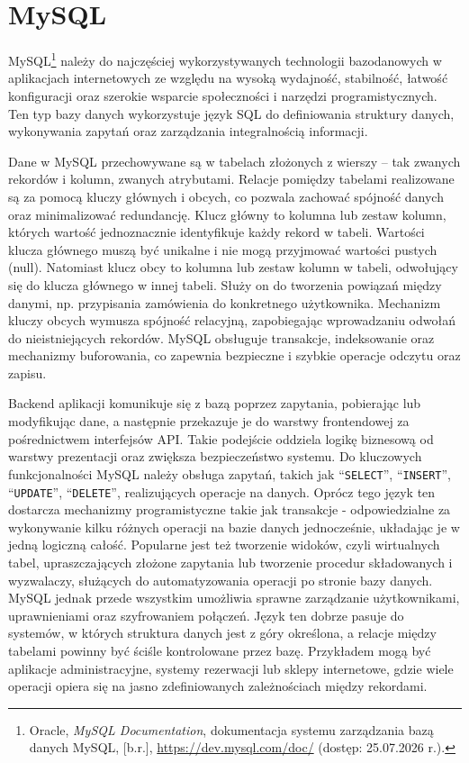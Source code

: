 \documentclass[12pt,a4paper,twoside]{report}
\newcommand{\FirstParagraph}{\noindent\ignorespaces}
\begin{document}
\section{MySQL}

\FirstParagraph MySQL\footnote{Oracle, \emph{MySQL Documentation}, dokumentacja systemu zarządzania bazą danych MySQL, [b.r.], \url{https://dev.mysql.com/doc/} (dostęp: 25.07.2026 r.).} należy do najczęściej wykorzystywanych technologii bazodanowych w aplikacjach internetowych ze względu na wysoką wydajność, stabilność, łatwość konfiguracji oraz szerokie wsparcie społeczności i narzędzi programistycznych. Ten typ bazy danych wykorzystuje język SQL do definiowania struktury danych, wykonywania zapytań oraz zarządzania integralnością informacji.

Dane w MySQL przechowywane są w tabelach złożonych z wierszy -- tak zwanych rekordów i kolumn, zwanych atrybutami. Relacje pomiędzy tabelami realizowane są za pomocą kluczy głównych i obcych, co pozwala zachować spójność danych oraz minimalizować redundancję. Klucz główny to kolumna lub zestaw kolumn, których wartość jednoznacznie identyfikuje każdy rekord w tabeli. Wartości klucza głównego muszą być unikalne i nie mogą przyjmować wartości pustych (null). Natomiast klucz obcy to kolumna lub zestaw kolumn w tabeli, odwołujący się do klucza głównego w innej tabeli. Służy on do tworzenia powiązań między danymi, np. przypisania zamówienia do konkretnego użytkownika. Mechanizm kluczy obcych wymusza spójność relacyjną, zapobiegając wprowadzaniu odwołań do nieistniejących rekordów. MySQL obsługuje transakcje, indeksowanie oraz mechanizmy buforowania, co zapewnia bezpieczne i szybkie operacje odczytu oraz zapisu.

Backend aplikacji komunikuje się z bazą poprzez zapytania, pobierając lub modyfikując dane, a następnie przekazuje je do warstwy frontendowej za pośrednictwem interfejsów API. Takie podejście oddziela logikę biznesową od warstwy prezentacji oraz zwiększa bezpieczeństwo systemu. Do kluczowych funkcjonalności MySQL należy obsługa zapytań, takich jak ``\texttt{SELECT}'', ``\texttt{INSERT}'', ``\texttt{UPDATE}'', ``\texttt{DELETE}'', realizujących operacje na danych.
Oprócz tego język ten dostarcza mechanizmy programistyczne takie jak transakcje - odpowiedzialne za wykonywanie kilku różnych operacji na bazie danych jednocześnie, układając je w jedną logiczną całość. Popularne jest też tworzenie widoków, czyli wirtualnych tabel, upraszczających złożone zapytania lub tworzenie procedur składowanych i wyzwalaczy, służących do automatyzowania operacji po stronie bazy danych. MySQL jednak przede wszystkim umożliwia sprawne zarządzanie użytkownikami, uprawnieniami oraz szyfrowaniem połączeń. Język ten dobrze pasuje do systemów, w których struktura danych jest z góry określona, a relacje między tabelami powinny być ściśle kontrolowane przez bazę. Przykładem mogą być aplikacje administracyjne, systemy rezerwacji lub sklepy internetowe, gdzie wiele operacji opiera się na jasno zdefiniowanych zależnościach między rekordami.
\end{document}
